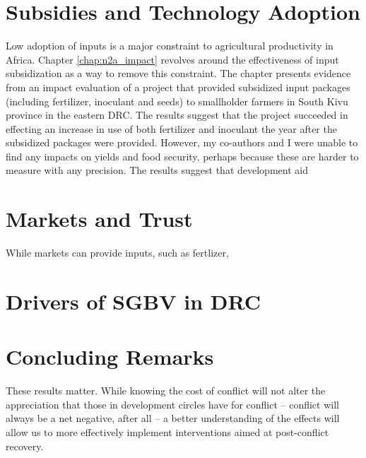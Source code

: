 \section{Subsidies and Technology Adoption}
Low adoption of  inputs is a major constraint to agricultural productivity in Africa. Chapter \ref{chap:n2a_impact} revolves around the effectiveness of input subsidization as a way to remove this constraint. The chapter presents evidence from an impact evaluation of a project that provided subsidized input packages (including fertilizer, inoculant and seeds) to smallholder farmers in South Kivu province in the eastern DRC. The results suggest that the project succeeded in effecting an increase in use of both fertilizer and inoculant the year after the subsidized packages were provided. However, my co-authors and I were unable to find any impacts on yields and food security, perhaps because these are harder to measure with any precision. The results suggest that development aid 

\section{Markets and Trust}
While markets can provide inputs, such as fertlizer, 

\section{Drivers of SGBV in DRC}

\section{Concluding Remarks}


These results matter. While knowing the cost of conflict will not alter the appreciation that those in development circles have for conflict -- conflict will always be a net negative, after all -- a better understanding of the effects will allow us to more effectively implement interventions aimed at post-conflict recovery. 


